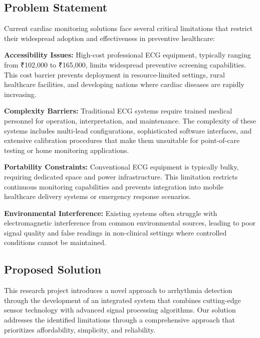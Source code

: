 \documentclass[12pt,a4paper]{article}
\begin{document}
\begin{multicols}{2}
\subsection{Problem Statement}

Current cardiac monitoring solutions face several critical limitations that restrict their widespread adoption and effectiveness in preventive healthcare:

\vspace{0.3cm}

\textbf{Accessibility Issues:} High-cost professional ECG equipment, typically ranging from ₹102,000 to ₹165,000, limits widespread preventive screening capabilities. This cost barrier prevents deployment in resource-limited settings, rural healthcare facilities, and developing nations where cardiac diseases are rapidly increasing.

\textbf{Complexity Barriers:} Traditional ECG systems require trained medical personnel for operation, interpretation, and maintenance. The complexity of these systems includes multi-lead configurations, sophisticated software interfaces, and extensive calibration procedures that make them unsuitable for point-of-care testing or home monitoring applications.

\textbf{Portability Constraints:} Conventional ECG equipment is typically bulky, requiring dedicated space and power infrastructure. This limitation restricts continuous monitoring capabilities and prevents integration into mobile healthcare delivery systems or emergency response scenarios.

\textbf{Environmental Interference:} Existing systems often struggle with electromagnetic interference from common environmental sources, leading to poor signal quality and false readings in non-clinical settings where controlled conditions cannot be maintained.

\subsection{Proposed Solution}

This research project introduces a novel approach to arrhythmia detection through the development of an integrated system that combines cutting-edge sensor technology with advanced signal processing algorithms. Our solution addresses the identified limitations through a comprehensive approach that prioritizes affordability, simplicity, and reliability.


\end{multicols}
\end{document}
